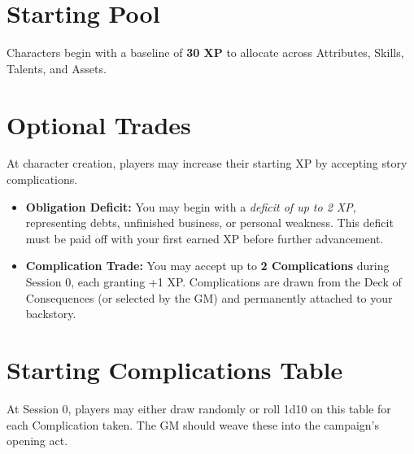 \documentclass[12pt]{book}
\begin{document}
\section{Starting Pool}
Characters begin with a baseline of \textbf{30 XP} to allocate across Attributes, Skills, Talents, and Assets.

\section{Optional Trades}
At character creation, players may increase their starting XP by accepting story complications.  

\begin{itemize}
  \item \textbf{Obligation Deficit:} You may begin with a \emph{deficit of up to 2 XP}, representing debts, unfinished business, or personal weakness. This deficit must be paid off with your first earned XP before further advancement.  
  \item \textbf{Complication Trade:} You may accept up to \textbf{2 Complications} during Session 0, each granting +1 XP. Complications are drawn from the Deck of Consequences (or selected by the GM) and permanently attached to your backstory.  
\end{itemize}

\section{Starting Complications Table}
At Session 0, players may either draw randomly or roll 1d10 on this table for each Complication taken. The GM should weave these into the campaign’s opening act.
\end{document}
